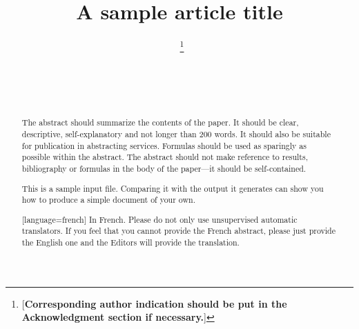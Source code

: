 \documentclass[aihp]{imsart}
\theoremstyle{plain}
\theoremstyle{definition}
\begin{document}
\begin{frontmatter}
\title{A sample article title}

\begin{aug}
\author[A]{~\thanks{[\textbf{Corresponding author indication should be put in the Acknowledgment section if necessary.}]}}
\author[B]{~}
\author[B]{~}
\address[A]{Department,
University or Company Name, City, Country}

\address[B]{Department,
University or Company Name, City, Country}
\end{aug}

\begin{abstract}
The abstract should summarize the contents of the paper.
It should be clear, descriptive, self-explanatory and not longer
than 200 words. It should also be suitable for publication in
abstracting services. Formulas should be used as sparingly as
possible within the abstract. The abstract should not make
reference to results, bibliography or formulas in the body
of the paper---it should be self-contained.

This is a sample input file.  Comparing it with the output it
generates can show you how to produce a simple document of
your own.
\end{abstract}

\begin{abstract}[language=french]
In French. Please do not only use unsupervised automatic translators. If you feel that you cannot provide the French abstract, please just provide the English one and the Editors will provide the translation.
\end{abstract}

\begin{keyword}[class=MSC]
\end{keyword}

\begin{keyword}
\end{keyword}

\end{frontmatter}
\end{document}
